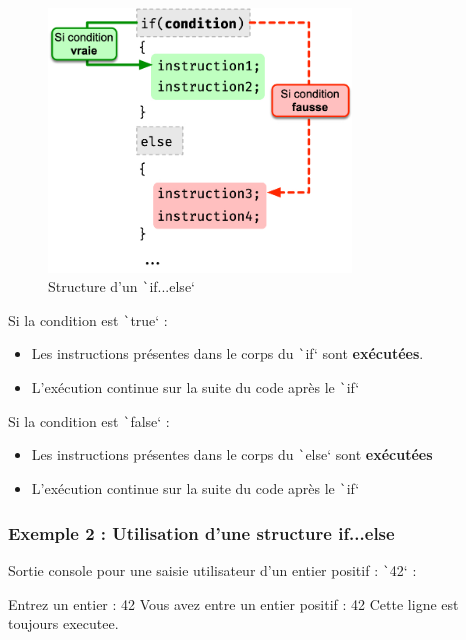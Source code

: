 \documentclass[10pt]{article}
\begin{document}
\smallskip
\begin{multicols}{2}
\begin{figure}[H]
    \includegraphics[max height=7cm,max width = \textwidth/2]{assets/ifElse.jpg}
    \centering
    \caption{Structure d'un \texttt`if...else`}
\end{figure}

Si la condition est \texttt`true` :
\begin{itemize}
    \item Les instructions présentes dans le corps du \texttt`if` sont \textbf{exécutées}.
    \item L'exécution continue sur la suite du code après le \texttt`if`
\end{itemize}
Si la condition est \texttt`false` :
\begin{itemize}
    \item Les instructions présentes dans le corps du \texttt`else` sont \textbf{exécutées}
    \item L'exécution continue sur la suite du code après le \texttt`if` 
\end{itemize}
\end{multicols}

\subsubsection{Exemple 2 : Utilisation d'une structure if...else}
\label{exempleStrucIfElse}

\bigskip
Sortie console pour une saisie utilisateur d'un entier positif : \texttt`42`  :

\begin{textcode}
    Entrez un entier : 42
    Vous avez entre un entier positif : 42
    Cette ligne est toujours executee.
\end{textcode}
\end{document}
